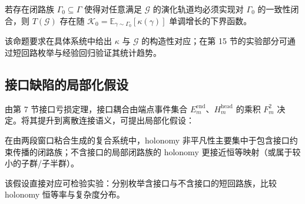 \begin{proposition}
若存在闭路族 $\Gamma_0\subseteq\Gamma$ 使得对任意满足 $\mathcal G$ 的演化轨道均必须实现对 $\Gamma_0$ 的一致性闭合，则 $T(\mathcal G)$ 存在随 $\mathcal K_0=\mathbb E_{\gamma\sim\Gamma_0}[\kappa(\gamma)]$ 单调增长的下界函数。
\end{proposition}

该命题要求在具体系统中给出 $\kappa$ 与 $\mathcal G$ 的构造性对应；在第 15 节的实验部分可通过短回路枚举与经验回归验证其统计趋势。

\subsection{接口缺陷的局部化假设}

由第 7 节接口亏损定理，接口耦合由端点事件集合 $E_m^{\mathrm{end}}$、$H_m^{\mathrm{head}}$ 的乘积 $F_m^2$ 决定。将其提升到离散连接语义，可提出局部化假设：

\begin{assumption}[接口曲率集中]
在由两段窗口粘合生成的复合系统中，holonomy 非平凡性主要集中于包含接口约束传播的闭路族；不含接口的局部闭路族的 holonomy 更接近恒等映射（或属于较小的子群/子半群）。
\end{assumption}

该假设直接对应可检验实验：分别枚举含接口与不含接口的短回路族，比较 holonomy 恒等率与复杂度分布。

